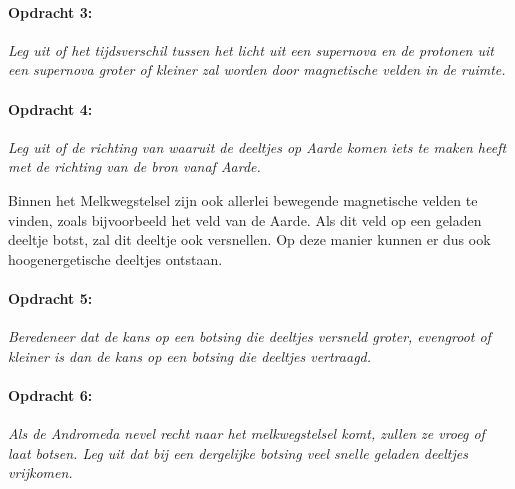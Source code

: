 \paragraph*{Opdracht 3:}

\emph{Leg uit of het tijdsverschil tussen het licht uit een supernova
en de protonen uit een supernova groter of kleiner zal worden door
magnetische velden in de ruimte.}


\paragraph*{Opdracht 4:}

\emph{Leg uit of de richting van waaruit de deeltjes op Aarde komen
iets te maken heeft met de richting van de bron vanaf Aarde.}

Binnen het Melkwegstelsel zijn ook allerlei bewegende magnetische
velden te vinden, zoals bijvoorbeeld het veld van de Aarde. Als dit
veld op een geladen deeltje botst, zal dit deeltje ook versnellen.
Op deze manier kunnen er dus ook hoogenergetische deeltjes ontstaan.


\paragraph*{Opdracht 5:}

\emph{Beredeneer dat de kans op een botsing die deeltjes versneld
groter, evengroot of kleiner is dan de kans op een botsing die deeltjes
vertraagd.}


\paragraph*{Opdracht 6:}

\emph{Als de Andromeda nevel recht naar het melkwegstelsel komt, zullen
ze vroeg of laat botsen. Leg uit dat bij een dergelijke botsing veel
snelle geladen deeltjes vrijkomen.}


